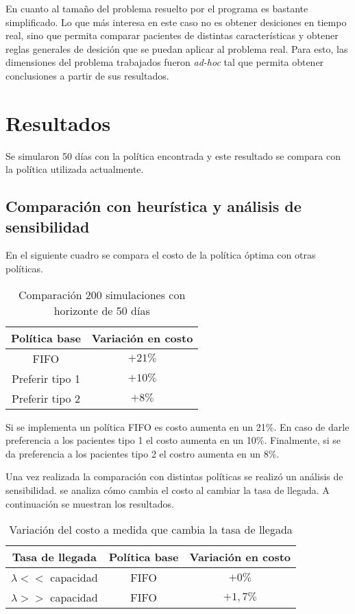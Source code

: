 \documentclass[letterpaper,10pt]{article}
\begin{document}
En cuanto al tamaño del problema resuelto por el programa es bastante simplificado. Lo que más interesa en este caso no es obtener desiciones en tiempo real, sino que permita comparar pacientes de distintas características y obtener reglas generales de desición que se puedan aplicar al problema real. Para esto, las dimensiones del problema trabajados fueron \textit{ad-hoc} tal que permita obtener conclusiones a partir de sus resultados.

\section*{Resultados}

Se simularon 50 días con la política encontrada y este resultado se compara con la política utilizada actualmente.

\subsection*{Comparación con heurística y análisis de sensibilidad}

En el siguiente cuadro se compara el costo de la política óptima con otras políticas. 

\begin{table}[h]
\centering
\begin{tabular}{|c|c|}
\hline
\textbf{Política base} & \textbf{Variación en costo} \\ \hline
FIFO                   & $+21\%$                     \\ \hline
Preferir tipo 1        & $+10\%$                     \\ \hline
Preferir tipo 2        & $+8\%$                      \\ \hline
\end{tabular}
\caption{Comparación 200 simulaciones con horizonte de 50 días}
\end{table}

Si se implementa un política FIFO es costo aumenta en un 21\%. En caso de darle preferencia a los pacientes tipo 1 el costo aumenta en un 10\%. Finalmente, si se da preferencia a los pacientes tipo 2 el costro aumenta en un 8\%.

Una vez realizada la comparación con distintas políticas se realizó un análisis de sensibilidad. se analiza cómo cambia el costo al cambiar la tasa de llegada. A continuación se muestran los resultados.

\begin{table}[h]
\centering
\begin{tabular}{|c|c|c|}
\hline
\textbf{Tasa de llegada} & \textbf{Política base} & \textbf{Variación en costo} \\ \hline
$\lambda <<$ capacidad   & FIFO                   & $+0\%$                      \\ \hline
$\lambda >>$ capacidad   & FIFO                   & $+1,7\%$                    \\ \hline
\end{tabular}
\caption{Variación del costo a medida que cambia la tasa de llegada}
\end{table}
\end{document}
